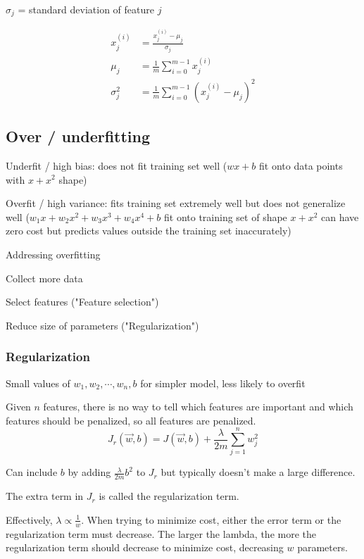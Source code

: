 \documentclass[12pt]{article}
\begin{document}
$\sigma_j$ = standard deviation of feature $j$

\begin{align*}
x_j^{(i)} &= \frac{x_j^{(i)} - \mu_j}{\sigma_j}\\
\mu_j &= \frac{1}{m} \sum_{i=0}^{m-1} x_j^{(i)}\\
\sigma_j^2 &= \frac{1}{m} \sum_{i=0}^{m-1} (x_j^{(i)} - \mu_j)^2
\end{align*}

\subsection{Over / underfitting}

Underfit / high bias: does not fit training set well ($wx + b$ fit onto data points with $x + x^2$ shape)

Overfit / high variance: fits training set extremely well but does not generalize well ($w_1 x + w_2 x^2 + w_3 x^3 + w_4 x^4 + b$ fit onto training set of shape $x + x^2$ can have zero cost but predicts values outside the training set inaccurately)

\vspace{5px}

Addressing overfitting
\begin{myitemize}
	\item Collect more data
	\item Select features ("Feature selection")
	\item Reduce size of parameters ("Regularization")
\end{myitemize}

\subsubsection{Regularization}

Small values of $w_1,w_2,\cdots,w_n,b$ for simpler model, less likely to overfit

Given $n$ features, there is no way to tell which features are important and which features should be penalized, so all features are penalized.
\[ J_r(\vec{w},b) = J(\vec{w},b) + \frac{\lambda}{2m} \sum_{j=1}^n w_j^2 \]

Can include $b$ by adding $\frac{\lambda}{2m} b^2$ to $J_r$ but typically doesn't make a large difference.

The extra term in $J_r$ is called the regularization term.

Effectively, $\lambda \propto \frac{1}{w}$. When trying to minimize cost, either the error term or the regularization term must decrease. The larger the lambda, the more the regularization term should decrease to minimize cost, decreasing $w$ parameters.
\end{document}
